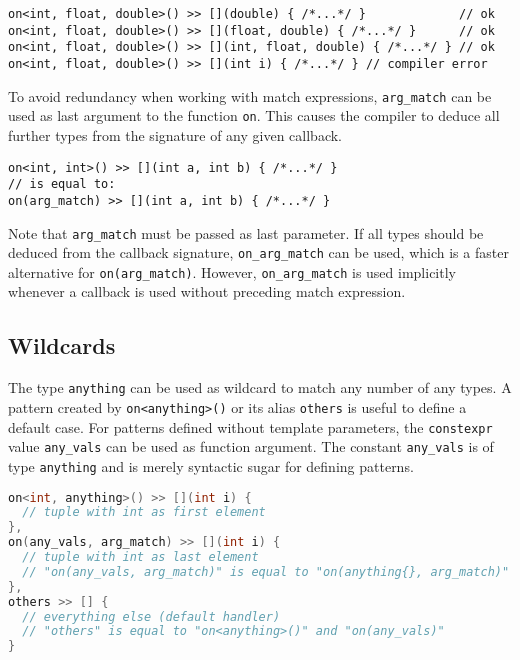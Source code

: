 \begin{lstlisting}
on<int, float, double>() >> [](double) { /*...*/ }             // ok
on<int, float, double>() >> [](float, double) { /*...*/ }      // ok
on<int, float, double>() >> [](int, float, double) { /*...*/ } // ok
on<int, float, double>() >> [](int i) { /*...*/ } // compiler error
\end{lstlisting}

To avoid redundancy when working with match expressions, \lstinline^arg_match^ can be used as last argument to the function \lstinline^on^.
This causes the compiler to deduce all further types from the signature of any given callback.

\begin{lstlisting}
on<int, int>() >> [](int a, int b) { /*...*/ }
// is equal to:
on(arg_match) >> [](int a, int b) { /*...*/ }
\end{lstlisting}

Note that \lstinline^arg_match^ must be passed as last parameter.
If all types should be deduced from the callback signature, \lstinline^on_arg_match^ can be used, which is a faster alternative for \lstinline^on(arg_match)^.
However, \lstinline^on_arg_match^ is used implicitly whenever a callback is used without preceding match expression.

\subsection{Wildcards}

The type \lstinline^anything^ can be used as wildcard to match any number of any types.
A pattern created by \lstinline^on<anything>()^ or its alias \lstinline^others^ is useful to define a default case.
For patterns defined without template parameters, the \lstinline^constexpr^ value \lstinline^any_vals^ can be used as function argument.
The constant \lstinline^any_vals^ is of type \lstinline^anything^ and is merely syntactic sugar for defining patterns.

\begin{lstlisting}[language=C++]
on<int, anything>() >> [](int i) {
  // tuple with int as first element
},
on(any_vals, arg_match) >> [](int i) {
  // tuple with int as last element
  // "on(any_vals, arg_match)" is equal to "on(anything{}, arg_match)"
},
others >> [] {
  // everything else (default handler)
  // "others" is equal to "on<anything>()" and "on(any_vals)"
}
\end{lstlisting}

